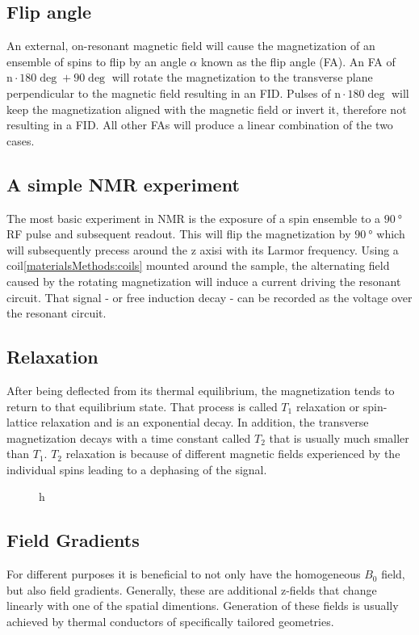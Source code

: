         \subsection{Flip angle}
            An external, on-resonant magnetic field will cause the magnetization of an ensemble of
            spins to flip by an angle $\alpha$ known as the flip angle (FA). An FA of $\mathrm n\cdot 180
            \deg + 90 \deg$ will rotate the magnetization to the transverse plane perpendicular to the magnetic field
            resulting in an FID. Pulses of $\mathrm n\cdot 180 \deg$ will keep the magnetization aligned
            with the magnetic field or invert it, therefore not resulting in a FID. All other FAs
            will produce a linear combination of the two cases.
        \subsection{A simple NMR experiment}
        The most basic experiment in NMR is the exposure of a spin ensemble to a $\SI{90}{\degree}$
        RF pulse and subsequent readout. This will flip the magnetization by $\SI{90}{\degree}$
        which will subsequently precess around the z axisi with its Larmor frequency. Using a coil\ref{materialsMethods:coils}
        mounted around the sample, the alternating field caused by the rotating magnetization will induce a
        current driving the resonant circuit. That signal - or free induction decay - can be
        recorded as the voltage over the resonant circuit.
        \subsection{Relaxation}
        After being deflected from its thermal equilibrium, the magnetization tends to return to
        that equilibrium state. That process is called $T_1$ relaxation or spin-lattice relaxation
        and is an exponential decay. In addition, the transverse magnetization decays with a time
        constant called $T_2$ that is usually much smaller than $T_1$. $T_2$ relaxation is because
        of different magnetic fields experienced by the individual spins leading to a dephasing of
        the signal.
        \begin{figure}{h}
        \end{figure}
        \subsection{Field Gradients}
        For different purposes it is beneficial to not only have the homogeneous $B_0$ field, but
        also field gradients. Generally, these are additional z-fields that change linearly with one
        of the spatial dimentions. Generation of these fields is usually achieved by thermal
        conductors of specifically tailored geometries.
